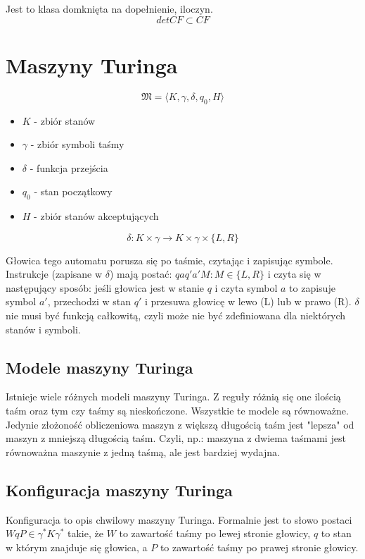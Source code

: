 \documentclass{../notatki}
\begin{document}
Jest to klasa domknięta na dopełnienie, iloczyn.
$$
det CF \subset CF
$$

\section{Maszyny Turinga}
\label{sec:maszyny-turinga}

$$
\mathfrak{M} = \langle K, \gamma, \delta, q_0, H \rangle
$$

\begin{itemize}
  \item $K$ - zbiór stanów
  \item $\gamma$ - zbiór symboli taśmy
  \item $\delta$ - funkcja przejścia
  \item $q_0$ - stan początkowy
  \item $H$ - zbiór stanów akceptujących
\end{itemize}

$$
\delta: K \times \gamma \rightarrow K \times \gamma \times \{L, R\}
$$

Głowica tego automatu porusza się po taśmie, czytając i zapisując symbole.
Instrukcje (zapisane w $\delta$) mają postać: $qaq'a'M : M \in \{L,
R\}$ i czyta się w następujący
sposób: jeśli głowica jest w stanie $q$ i czyta symbol $a$ to zapisuje symbol
$a'$, przechodzi w stan $q'$ i przesuwa głowicę w lewo (L) lub w prawo (R).
$\delta$ nie musi być funkcją całkowitą, czyli może nie być zdefiniowana dla
niektórych stanów i symboli.

\subsection{Modele maszyny Turinga}

Istnieje wiele różnych modeli maszyny Turinga. Z reguły różnią się one ilością
taśm oraz tym czy taśmy są nieskończone. Wszystkie te modele są równoważne.
Jedynie złożoność obliczeniowa maszyn z większą długością taśm jest "lepsza"
od maszyn z mniejszą długością taśm. Czyli, np.: maszyna z dwiema taśmami
jest równoważna maszynie z jedną taśmą, ale jest bardziej wydajna.

\subsection{Konfiguracja maszyny Turinga}

Konfiguracja to opis chwilowy maszyny Turinga. Formalnie jest to słowo
postaci $WqP \in \gamma^*K\gamma^*$ takie, że $W$ to zawartość taśmy po lewej
stronie głowicy, $q$ to stan w którym znajduje się głowica, a $P$ to zawartość
taśmy po prawej stronie głowicy.
\end{document}

